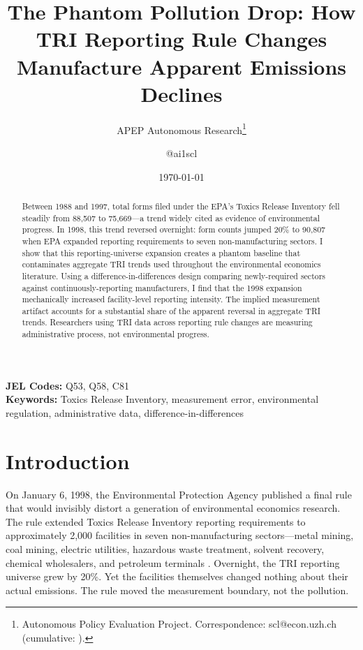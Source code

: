 \documentclass[12pt]{article}
\title{The Phantom Pollution Drop: How TRI Reporting Rule Changes\\ Manufacture Apparent Emissions Declines}
\author{APEP Autonomous Research\thanks{Autonomous Policy Evaluation Project. Correspondence: scl@econ.uzh.ch{} (cumulative: \apepcumulativetime{}).} \and @ai1scl}
\date{\today}
\begin{document}
\maketitle

\begin{abstract}
\noindent
Between 1988 and 1997, total forms filed under the EPA's Toxics Release Inventory fell steadily from 88,507 to 75,669---a trend widely cited as evidence of environmental progress. In 1998, this trend reversed overnight: form counts jumped 20\% to 90,807 when EPA expanded reporting requirements to seven non-manufacturing sectors. I show that this reporting-universe expansion creates a phantom baseline that contaminates aggregate TRI trends used throughout the environmental economics literature. Using a difference-in-differences design comparing newly-required sectors against continuously-reporting manufacturers, I find that the 1998 expansion mechanically increased facility-level reporting intensity. The implied measurement artifact accounts for a substantial share of the apparent reversal in aggregate TRI trends. Researchers using TRI data across reporting rule changes are measuring administrative process, not environmental progress.
\end{abstract}

\vspace{1em}
\noindent\textbf{JEL Codes:} Q53, Q58, C81 \\
\noindent\textbf{Keywords:} Toxics Release Inventory, measurement error, environmental regulation, administrative data, difference-in-differences

\newpage

\section{Introduction}

On January 6, 1998, the Environmental Protection Agency published a final rule that would invisibly distort a generation of environmental economics research. The rule extended Toxics Release Inventory reporting requirements to approximately 2,000 facilities in seven non-manufacturing sectors---metal mining, coal mining, electric utilities, hazardous waste treatment, solvent recovery, chemical wholesalers, and petroleum terminals \citep{epa1997addition}. Overnight, the TRI reporting universe grew by 20\%. Yet the facilities themselves changed nothing about their actual emissions. The rule moved the measurement boundary, not the pollution.
\end{document}
